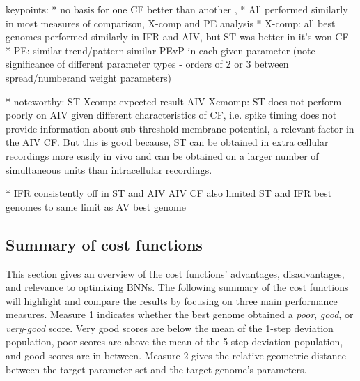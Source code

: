 \medskip{}

keypoints:
* no basis for one CF better than another , 
* All performed similarly in most measures of comparison, X-comp and PE analysis
* X-comp: all best genomes performed similarly in IFR and AIV, but ST was better in it's won CF
* PE: similar trend/pattern similar PEvP in each given parameter (note significance of different parameter types - orders of 2 or 3 between spread/numberand weight parameters)

* noteworthy: ST Xcomp: expected result AIV Xcmomp: ST does not
perform poorly on AIV given different characteristics of CF,
i.e. spike timing does not provide information about
sub-threshold membrane potential, a relevant factor in the AIV
CF.  But this is good because, ST can be obtained in extra
cellular recordings more easily in vivo and can be obtained on a larger
number of simultaneous units than intracellular recordings.


*       IFR consistently off in ST and AIV
AIV CF also limited  ST and IFR best genomes to same limit as AV best genome 



\subsection{Summary of cost functions}\label{sec:GA:summ-cost-funct}

This section gives an overview of the cost functions' advantages, disadvantages,
and relevance to optimizing BNNs. The following summary of the cost functions
will highlight and compare the results by focusing on three main performance
measures.  Measure 1 indicates whether the best genome obtained a \textit{poor},
\textit{good}, or \textit{very-good} score. Very good scores are below the mean
of the 1-step deviation population, poor scores are above the mean of the 5-step
deviation population, and good scores are in between.  %
Measure 2 gives the relative geometric distance between the target
parameter set and the target genome's parameters.

